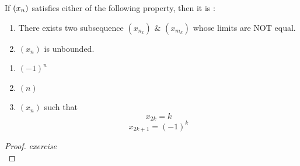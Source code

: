 \documentclass[a4paper,12pt]{article}
\begin{document}
\begin{theorem}
    If \((x_{n})\) satisfies either of the following property, then it is :
    \begin{enumerate}
        \item There exists two subsequence \((x_{n_k})\) \& \((x_{m_k})\) whose limits are NOT equal.
        \item \((x_n)\) is unbounded.\\
    \end{enumerate}
\end{theorem}

\begin{example}
    \text{\\}
    \begin{enumerate}
        \item \((-1)^n\)
        \item \((n)\)
        \item \((x_n)\) such that \[x_{2k} = k\]\[x_{2k+1} = (-1)^k\]
    \end{enumerate}
\end{example}
\begin{proof}
    \textit{exercise}\\
\end{proof}
\end{document}
